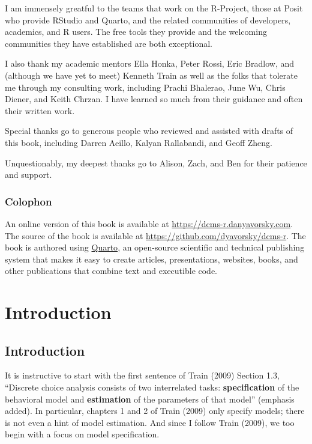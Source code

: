 \documentclass[
  letterpaper,
  DIV=11,
  numbers=noendperiod]{scrreprt}
\begin{document}

I am immensely greatful to the teams that work on the R-Project, those
at Posit who provide RStudio and Quarto, and the related communities of
developers, academics, and R users. The free tools they provide and the
welcoming communities they have established are both exceptional.

I also thank my academic mentors Ella Honka, Peter Rossi, Eric Bradlow,
and (although we have yet to meet) Kenneth Train as well as the folks
that tolerate me through my consulting work, including Prachi Bhalerao,
June Wu, Chris Diener, and Keith Chrzan. I have learned so much from
their guidance and often their written work.

Special thanks go to generous people who reviewed and assisted with
drafts of this book, including Darren Aeillo, Kalyan Rallabandi, and
Geoff Zheng.

Unquestionably, my deepest thanks go to Alison, Zach, and Ben for their
patience and support.

\section*{Colophon}\label{colophon}


An online version of this book is available at
\url{https://dcms-r.danyavorsky.com}. The source of the book is
available at \url{https://github.com/dyavorsky/dcms-r}. The book is
authored using \href{https://quarto.org}{Quarto}, an open-source
scientific and technical publishing system that makes it easy to create
articles, presentations, websites, books, and other publications that
combine text and executible code.

\part{Introduction}

\chapter{Introduction}\label{sec-introduction}

It is instructive to start with the first sentence of Train (2009)
Section 1.3, ``Discrete choice analysis consists of two interrelated
tasks: \textbf{specification} of the behavioral model and
\textbf{estimation} of the parameters of that model'' (emphasis added).
In particular, chapters 1 and 2 of Train (2009) only specify models;
there is not even a hint of model estimation. And since I follow Train
(2009), we too begin with a focus on model specification.
\end{document}
